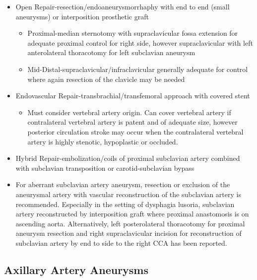 \documentclass[
]{book}
\providecommand{\tightlist}{%
  \setlength{\itemsep}{0pt}\setlength{\parskip}{0pt}}
\begin{document}
\begin{itemize}
\item
  Open Repair-resection/endoaneurysmorrhaphy with end to end (small
  aneurysms) or interposition prosthetic graft\citep{vierhout2010}

  \begin{itemize}
  \item
    Proximal-median sternotomy with supraclavicular fossa extension
    for adequate proximal control for right side, however
    supraclavicular with left anterolateral thoracotomy for left
    subclavian aneurysm
  \item
    Mid-Distal-supraclavicular/infraclavicular generally adequate
    for control where again resection of the clavicle may be needed
  \end{itemize}
\item
  Endovascular Repair-transbrachial/transfemoral approach with covered
  stent\citep{maskanakis2018}

  \begin{itemize}
  \tightlist
  \item
    Must consider vertebral artery origin. Can cover vertebral
    artery if contralateral vertebral artery is patent and of
    adequate size, however posterior circulation stroke may occur
    when the contralateral vertebral artery is highly stenotic,
    hypoplastic or occluded.
  \end{itemize}
\item
  Hybrid Repair-embolization/coils of proximal subclavian artery
  combined with subclavian transposition or carotid-subclavian bypass
\item
  For aberrant subclavian artery aneurysm, resection or exclusion of
  the aneurysmal artery with vascular reconstruction of the subclavian
  artery is recommended. Especially in the setting of dysphagia
  lusoria, subclavian artery reconstructed by interposition graft
  where proximal anastomosis is on ascending aorta. Alternatively,
  left posterolateral thoracotomy for proximal aneurysm resection and
  right supraclavicular incision for reconstruction of subclavian
  artery by end to side to the right CCA has been reported.
\end{itemize}

\hypertarget{axillary-artery-aneurysms}{%
\subsection{Axillary Artery Aneurysms}\label{axillary-artery-aneurysms}}
\end{document}
